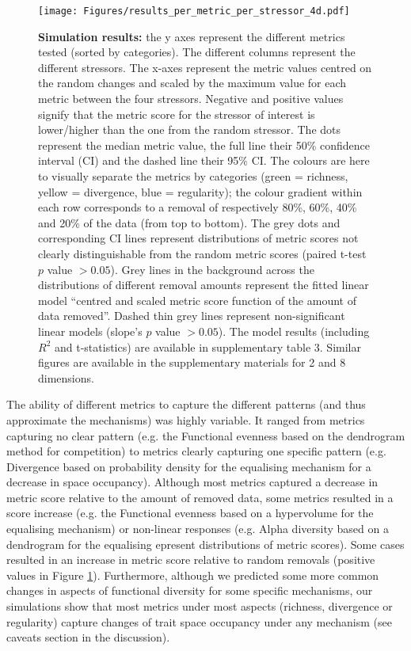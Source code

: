 \documentclass[12pt,letterpaper]{article}
\begin{document}
\begin{figure}[!htbp]
\centering
   \texttt{[image: Figures/results\_per\_metric\_per\_stressor\_4d.pdf]}
\caption{\scriptsize{\textbf{Simulation results:} the y axes represent the different metrics tested (sorted by categories).
The different columns represent the different stressors. The x-axes represent the metric values centred on the random changes and scaled by the maximum value for each metric between the four stressors.
Negative and positive values signify that the metric score for the stressor of interest is lower/higher than the one from the random stressor.
The dots represent the median metric value, the full line their 50\% confidence interval (CI) and the dashed line their 95\% CI.
The colours are here to visually separate the metrics by categories (green = richness, yellow = divergence, blue = regularity); the colour gradient within each row corresponds to a removal of respectively 80\%, 60\%, 40\% and 20\% of the data (from top to bottom).
The grey dots and corresponding CI lines represent distributions of metric scores not clearly distinguishable from the random metric scores (paired t-test $p$ value $> 0.05$).
Grey lines in the background across the distributions of different removal amounts represent the fitted linear model ``centred and scaled metric score function of the amount of data removed''.
Dashed thin grey lines represent non-significant linear models (slope's $p$ value $> 0.05$).
The model results (including $R^{2}$ and t-statistics) are available in supplementary table 3.
Similar figures are available in the supplementary materials for 2 and 8 dimensions.}}
\label{Fig:simulation_results}
\end{figure}
\bigskip

The ability of different metrics to capture the different patterns (and thus approximate the mechanisms) was highly variable.
It ranged from metrics capturing no clear pattern (e.g. the Functional evenness based on the dendrogram method for competition) to metrics clearly capturing one specific pattern (e.g. Divergence based on probability density for the equalising mechanism for a decrease in space occupancy).
Although most metrics captured a decrease in metric score relative to the amount of removed data, some metrics resulted in a score increase (e.g. the Functional evenness based on a hypervolume for the equalising mechanism) or non-linear responses (e.g. Alpha diversity based on a dendrogram for the equalising epresent distributions of metric scores).
Some cases resulted in an increase in metric score relative to random removals (positive values in Figure \ref{Fig:simulation_results}).
Furthermore, although we predicted some more common changes in aspects of functional diversity for some specific mechanisms, our simulations show that most metrics under most aspects (richness, divergence or regularity) capture changes of trait space occupancy under any mechanism (see caveats section in the discussion).
\end{document}
